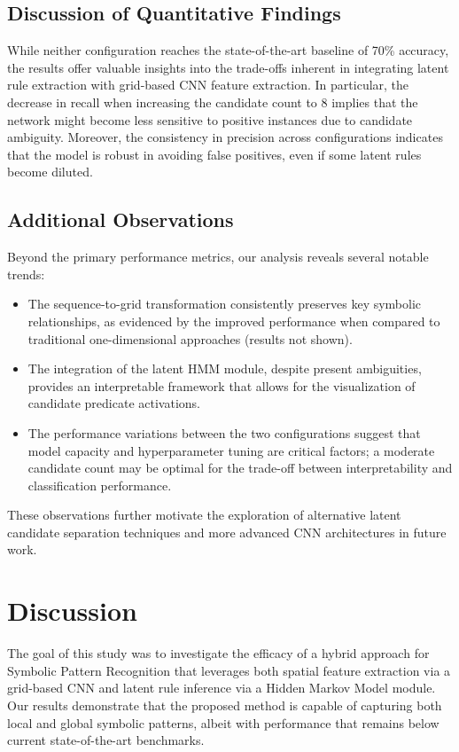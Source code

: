 \documentclass[11pt]{article}
\begin{document}
\subsection{Discussion of Quantitative Findings}
While neither configuration reaches the state-of-the-art baseline of 70\% accuracy, the results offer valuable insights into the trade-offs inherent in integrating latent rule extraction with grid-based CNN feature extraction. In particular, the decrease in recall when increasing the candidate count to 8 implies that the network might become less sensitive to positive instances due to candidate ambiguity. Moreover, the consistency in precision across configurations indicates that the model is robust in avoiding false positives, even if some latent rules become diluted.

\subsection{Additional Observations}
Beyond the primary performance metrics, our analysis reveals several notable trends:
\begin{itemize}
    \item The sequence-to-grid transformation consistently preserves key symbolic relationships, as evidenced by the improved performance when compared to traditional one-dimensional approaches (results not shown).
    \item The integration of the latent HMM module, despite present ambiguities, provides an interpretable framework that allows for the visualization of candidate predicate activations.
    \item The performance variations between the two configurations suggest that model capacity and hyperparameter tuning are critical factors; a moderate candidate count may be optimal for the trade-off between interpretability and classification performance.
\end{itemize}
These observations further motivate the exploration of alternative latent candidate separation techniques and more advanced CNN architectures in future work.

\section{Discussion}
The goal of this study was to investigate the efficacy of a hybrid approach for Symbolic Pattern Recognition that leverages both spatial feature extraction via a grid-based CNN and latent rule inference via a Hidden Markov Model module. Our results demonstrate that the proposed method is capable of capturing both local and global symbolic patterns, albeit with performance that remains below current state-of-the-art benchmarks.
\end{document}

